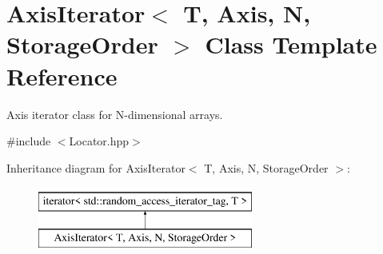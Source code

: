 \hypertarget{class_d_o_1_1_axis_iterator}{\section{Axis\-Iterator$<$ T, Axis, N, Storage\-Order $>$ Class Template Reference}
\label{class_d_o_1_1_axis_iterator}
}


Axis iterator class for N-\/dimensional arrays.  




{\ttfamily \#include $<$Locator.\-hpp$>$}

Inheritance diagram for Axis\-Iterator$<$ T, Axis, N, Storage\-Order $>$\-:\begin{figure}[H]
\begin{center}
\leavevmode
\includegraphics[height=2.000000cm]{class_d_o_1_1_axis_iterator}
\end{center}
\end{figure}
